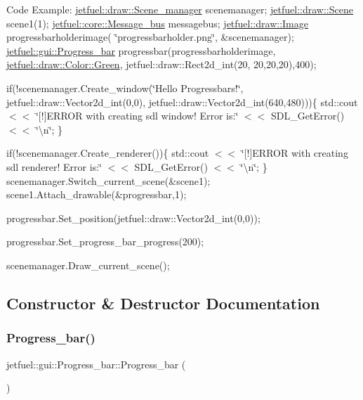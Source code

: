 Code Example\+: \hyperlink{classjetfuel_1_1draw_1_1Scene__manager}{jetfuel\+::draw\+::\+Scene\+\_\+manager} scenemanager; \hyperlink{classjetfuel_1_1draw_1_1Scene}{jetfuel\+::draw\+::\+Scene} scene1(1); \hyperlink{classjetfuel_1_1core_1_1Message__bus}{jetfuel\+::core\+::\+Message\+\_\+bus} messagebus; \hyperlink{classjetfuel_1_1draw_1_1Image}{jetfuel\+::draw\+::\+Image} progressbarholderimage( \char`\"{}progressbarholder.\+png\char`\"{}, \&scenemanager); \hyperlink{classjetfuel_1_1gui_1_1Progress__bar}{jetfuel\+::gui\+::\+Progress\+\_\+bar} progressbar(progressbarholderimage, \hyperlink{classjetfuel_1_1draw_1_1Color_a529fbdf4a2a9915e3986278715a5daa8}{jetfuel\+::draw\+::\+Color\+::\+Green}, jetfuel\+::draw\+::\+Rect2d\+\_\+int(20, 20,20,20),400);

if(!scenemanager.Create\+\_\+window(\char`\"{}\+Hello Progressbars!\char`\"{}, jetfuel\+::draw\+::\+Vector2d\+\_\+int(0,0), jetfuel\+::draw\+::\+Vector2d\+\_\+int(640,480)))\{ std\+::cout $<$$<$ \char`\"{}\mbox{[}!\mbox{]}\+E\+R\+R\+O\+R with creating sdl window! Error is\+:\char`\"{} $<$$<$ S\+D\+L\+\_\+\+Get\+Error() $<$$<$ \char`\"{}\textbackslash{}n\char`\"{}; \}

if(!scenemanager.Create\+\_\+renderer())\{ std\+::cout $<$$<$ \char`\"{}\mbox{[}!\mbox{]}\+E\+R\+R\+O\+R with creating sdl renderer! Error is\+:\char`\"{} $<$$<$ S\+D\+L\+\_\+\+Get\+Error() $<$$<$ \char`\"{}\textbackslash{}n\char`\"{}; \} scenemanager.\+Switch\+\_\+current\+\_\+scene(\&scene1); scene1.\+Attach\+\_\+drawable(\&progressbar,1);

progressbar.\+Set\+\_\+position(jetfuel\+::draw\+::\+Vector2d\+\_\+int(0,0));

progressbar.\+Set\+\_\+progress\+\_\+bar\+\_\+progress(200);

scenemanager.\+Draw\+\_\+current\+\_\+scene(); 

\subsection{Constructor \& Destructor Documentation}
\mbox{\label{classjetfuel_1_1gui_1_1Progress__bar_a82ff3b06366efe839c6031281db9b9ac}} 
\subsubsection{\texorpdfstring{Progress\+\_\+bar()}{Progress\_bar()}\hspace{0.1cm}{\footnotesize\ttfamily [1/2]}}
{\footnotesize\ttfamily jetfuel\+::gui\+::\+Progress\+\_\+bar\+::\+Progress\+\_\+bar (\begin{DoxyParamCaption}{ }\end{DoxyParamCaption})\hspace{0.3cm}{\ttfamily [inline]}}



